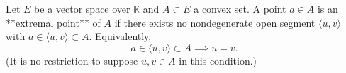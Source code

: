 Let $E$ be a vector space over $\mathbb{K}$ and $A \subset E$ a convex set. A point $a \in A$ is an **extremal point** of $A$ if there exists no nondegenerate open segment $\langle u, v \rangle$ with $a \in \langle u, v \rangle \subset A$. Equivalently,
$$a \in \langle u, v \rangle \subset A \implies u = v.$$
(It is no restriction to suppose $u, v \in A$ in this condition.)
